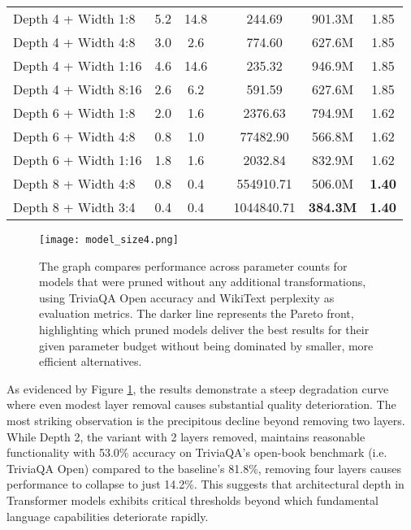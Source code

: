{\begin{table}[!htbp]
\begin{tabular}{lcccccc}
Depth 4 + Width 1:8 & 5.2 & 14.8 & & 244.69 & 901.3M & 1.85 \\
Depth 4 + Width 4:8 & 3.0 & 2.6 & & 774.60 & 627.6M & 1.85 \\
Depth 4 + Width 1:16 & 4.6 & 14.6 & & 235.32 & 946.9M & 1.85 \\
Depth 4 + Width 8:16 & 2.6 & 6.2 & & 591.59 & 627.6M & 1.85 \\
Depth 6 + Width 1:8 & 2.0 & 1.6 & & 2376.63 & 794.9M & 1.62 \\
Depth 6 + Width 4:8 & 0.8 & 1.0 & & 77482.90 & 566.8M & 1.62 \\
Depth 6 + Width 1:16 & 1.8 & 1.6 & & 2032.84 & 832.9M & 1.62 \\
Depth 8 + Width 4:8 & 0.8 & 0.4 & & 554910.71 & 506.0M & \textbf{1.40} \\
Depth 8 + Width 3:4 & 0.4 & 0.4 & & 1044840.71 & \textbf{384.3M} & \textbf{1.40} \\

\hline
\end{tabular}
\end{table}
}



\begin{figure}[!htbp]
    \centering
    \texttt{[image: model\_size4.png]}
    \caption[Comparison of Pruned Models]{The graph compares performance across parameter counts for models that were pruned without any additional transformations, using TriviaQA Open accuracy and WikiText perplexity as evaluation metrics. The darker line represents the Pareto front, highlighting which pruned models deliver the best results for their given parameter budget without being dominated by smaller, more efficient alternatives.}
    \label{fig:graph_size}
\end{figure}

As evidenced by Figure \ref{fig:graph_size}, the results demonstrate a steep degradation curve where even modest layer removal causes substantial quality deterioration. The most striking observation is the precipitous decline beyond removing two layers. While Depth 2, the variant with 2 layers removed, maintains reasonable functionality with 53.0\% accuracy on TriviaQA's open-book benchmark (i.e. TriviaQA Open) compared to the baseline's 81.8\%, removing four layers causes performance to collapse to just 14.2\%. This suggests that architectural depth in Transformer models exhibits critical thresholds beyond which fundamental language capabilities deteriorate rapidly.

